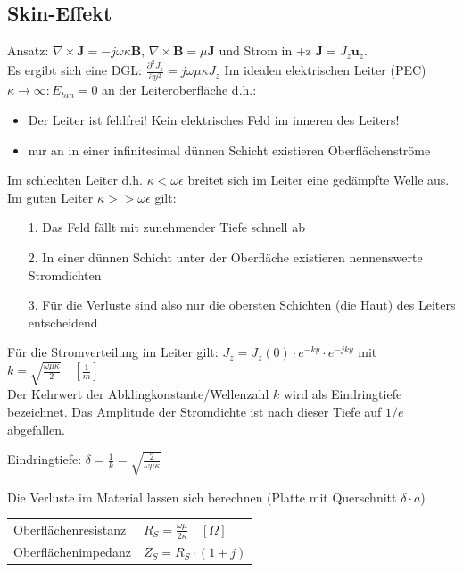 \documentclass[english]{latex4ei/latex4ei_sheet}
\begin{document}
\begin{sectionbox}
\subsection{Skin-Effekt}
Ansatz: $\nabla \times \mathbf{J} = -j\omega\kappa \mathbf{B}$, $\nabla\times\mathbf{B} = \mu \mathbf{J}$ und Strom in +z $\mathbf{J} = J_z \mathbf{u}_z$.\\
Es ergibt sich eine DGL: $\frac{\partial^2 J_z}{\partial y^2} = j\omega \mu \kappa J_z$
Im idealen elektrischen Leiter (PEC) $\kappa \to \infty: E_{tan} = 0$ an der Leiteroberfläche d.h.:\\
\begin{itemize}
	\item Der Leiter ist feldfrei! Kein elektrisches Feld im inneren des Leiters!
	\item nur an in einer infinitesimal dünnen Schicht existieren Oberflächenströme
\end{itemize}
Im schlechten Leiter d.h. $\kappa < \omega\epsilon$ breitet sich im Leiter eine gedämpfte Welle aus.\\
Im guten Leiter $\kappa >> \omega\epsilon$ gilt:
\begin{itemize}
	\item[1.] Das Feld fällt mit zunehmender Tiefe schnell ab
	\item[2.] In einer dünnen Schicht unter der Oberfläche existieren nennenswerte Stromdichten
	\item[3.] Für die Verluste sind also nur die obersten Schichten (die Haut) des Leiters entscheidend
\end{itemize}
Für die Stromverteilung im Leiter gilt: $J_z = J_z(0)\cdot e^{-ky}\cdot e^{-jky}$ mit $k = \sqrt{\frac{\omega\mu\kappa}{2}}\quad[\frac{1}{m}]$\\
Der Kehrwert der Abklingkonstante/Wellenzahl $k$ wird als Eindringtiefe bezeichnet. Das Amplitude der Stromdichte ist nach dieser Tiefe auf $1/e$ abgefallen.
\begin{emphbox}
Eindringtiefe: $\delta = \frac{1}{k} = \sqrt{\frac{2}{\omega \mu \kappa}}$
\end{emphbox}
Die Verluste im Material lassen sich berechnen (Platte mit Querschnitt $\delta \cdot a$)\\
\begin{tabular*}{\columnwidth}{ll}
	Oberflächenresistanz & $R_S = \frac{\omega\mu}{2\kappa} \quad [\Omega]$ \\
	Oberflächenimpedanz & $Z_S = R_S\cdot(1+j)$ \\

\end{tabular*}
\end{sectionbox}
\end{document}
